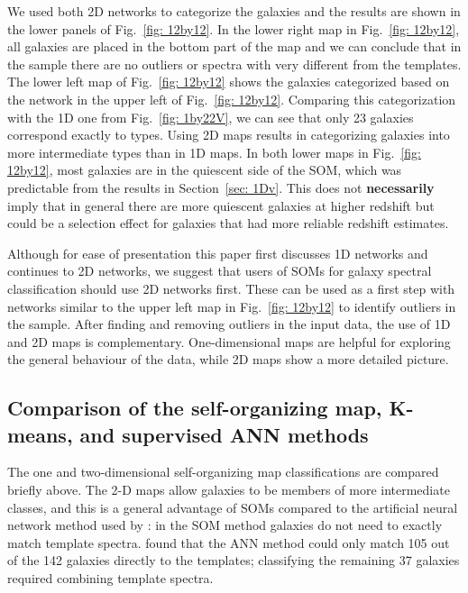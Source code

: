     
        We used both 2D networks to categorize the  galaxies and the results are shown in the lower panels of Fig.~\ref{fig: 12by12}.
        In the lower right map in Fig.~\ref{fig: 12by12}, all galaxies are placed in the bottom part of the map and we can conclude that in the  sample there are no outliers or spectra with very different from the  templates.
        The lower left map of Fig.~\ref{fig: 12by12} shows the  galaxies categorized based on the network in the upper left of Fig.~\ref{fig: 12by12}. 
        Comparing this categorization with the 1D one from Fig.~\ref{fig: 1by22V}, we can see that only 23 galaxies correspond exactly to  types.
        Using 2D maps results in categorizing galaxies into more intermediate types than in 1D maps.
        In both lower maps in Fig.~\ref{fig: 12by12}, most galaxies are in the quiescent side of the SOM, which was predictable from the results in Section~\ref{sec: 1Dv}.
        This does not \textbf{necessarily} imply that in general there are more quiescent galaxies at higher redshift but could be a selection effect for galaxies that had more reliable redshift estimates.
        
    Although for ease of presentation this paper first discusses 1D networks and continues to 2D networks, we suggest that users of SOMs for galaxy spectral classification should use 2D networks first.
         These can be used as a first step with networks similar to the upper left map in Fig.~\ref{fig: 12by12} to identify outliers in the sample.
        After finding and removing outliers in the input data, the use of 1D and 2D maps is complementary.
        One-dimensional maps are helpful for exploring the general behaviour of the data, while 2D maps show a more detailed picture.
   
\subsection{Comparison of the self-organizing map, K-means, and supervised ANN methods}
    \label{sec: Kmeansvssomvsann}
   
    The one and two-dimensional self-organizing map classifications are compared briefly above. 
    The 2-D maps allow galaxies to be members of more intermediate classes, and this is a general advantage of SOMs compared to the artificial neural network method used by : in the SOM method galaxies do not need to exactly match template spectra. 
     found that the ANN method could only match 105 out of the 142 galaxies directly to the  templates; classifying the remaining 37 galaxies required combining template spectra.
     
